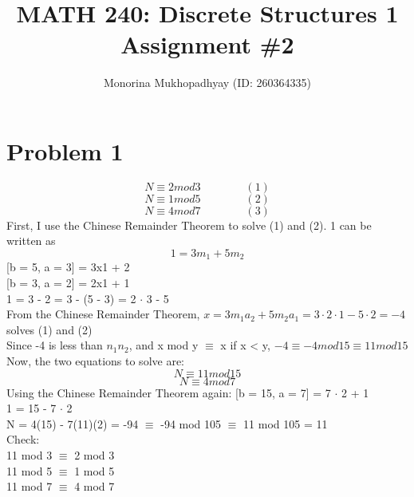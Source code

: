 \documentclass[english]{article}
\title{MATH 240: Discrete Structures 1 Assignment \#2}
\author{Monorina Mukhopadhyay (ID: 260364335)}
\begin{document}
\maketitle
\section*{Problem 1}
 $$ N \equiv 2 mod 3  \qquad \qquad (1)$$
 $$ N \equiv 1 mod 5  \qquad \qquad (2)$$
 $$ N \equiv 4 mod 7  \qquad \qquad (3)$$
 First, I use the Chinese Remainder Theorem to solve (1) and (2). 1 can be written as 
 $$ 1 = 3 m_1 + 5 m_2$$ 
 [b = 5, a = 3]  = 3x1 + 2\\
 {}[b = 3, a = 2]  = 2x1 + 1\\
 1 = 3 - 2 = 3 - (5 - 3) = 2 $\cdot$ 3 - 5\\
 From the Chinese Remainder Theorem, $x = 3 m_1 a_2 + 5 m_2 a_1 = 3 \cdot 2 \cdot 1 - 5 \cdot 2 = -4 $ solves (1) and (2) \\ Since -4 is less than $n_1 n_2$, and x mod y $\equiv $ x if x < y, $-4 \equiv -4 mod 15 \equiv 11 mod 15$
\\ 
Now, the two equations to solve are:
$$ N \equiv 11 mod 15 $$
$$ N \equiv 4 mod 7$$
Using the Chinese Remainder Theorem again:
[b = 15, a = 7]  = 7 $\cdot$ 2 + 1 \\
1 = 15 - 7 $\cdot$ 2 \\
N = 4(15) - 7(11)(2)  = -94 $\equiv$ -94 mod 105 $\equiv$ 11 mod 105 = 11 \\
Check:\\
11 mod 3 $\equiv$ 2 mod 3\\
11 mod 5 $\equiv$ 1 mod 5\\
11 mod 7 $\equiv$ 4 mod 7
\end{document}
